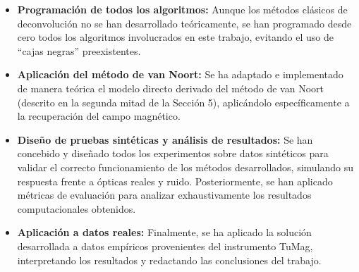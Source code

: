 \begin{itemize}
    \item \textbf{Programación de todos los algoritmos:} Aunque los métodos clásicos de deconvolución no se han desarrollado teóricamente, se han programado desde cero todos los algoritmos involucrados en este trabajo, evitando el uso de ``cajas negras'' preexistentes.
    \item \textbf{Aplicación del método de van Noort:} Se ha adaptado e implementado de manera teórica el modelo directo derivado del método de van Noort (descrito en la segunda mitad de la Sección 5), aplicándolo específicamente a la recuperación del campo magnético.
    \item \textbf{Diseño de pruebas sintéticas y análisis de resultados:} Se han concebido y diseñado todos los experimentos sobre datos sintéticos para validar el correcto funcionamiento de los métodos desarrollados, simulando su respuesta frente a ópticas reales y ruido. Posteriormente, se han aplicado métricas de evaluación para analizar exhaustivamente los resultados computacionales obtenidos.
    \item \textbf{Aplicación a datos reales:} Finalmente, se ha aplicado la solución desarrollada a datos empíricos provenientes del instrumento TuMag, interpretando los resultados y redactando las conclusiones del trabajo.
\end{itemize}
